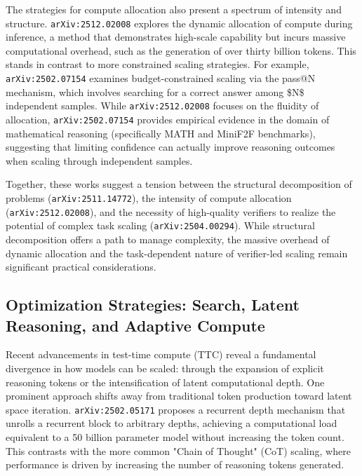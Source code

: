 \documentclass[11pt]{article}
\begin{document}
The strategies for compute allocation also present a spectrum of intensity and structure. \texttt{arXiv:2512.02008} explores the dynamic allocation of compute during inference, a method that demonstrates high-scale capability but incurs massive computational overhead, such as the generation of over thirty billion tokens. This stands in contrast to more constrained scaling strategies. For example, \texttt{arXiv:2502.07154} examines budget-constrained scaling via the pass@N mechanism, which involves searching for a correct answer among \$N\$ independent samples. While \texttt{arXiv:2512.02008} focuses on the fluidity of allocation, \texttt{arXiv:2502.07154} provides empirical evidence in the domain of mathematical reasoning (specifically MATH and MiniF2F benchmarks), suggesting that limiting confidence can actually improve reasoning outcomes when scaling through independent samples.

Together, these works suggest a tension between the structural decomposition of problems (\texttt{arXiv:2511.14772}), the intensity of compute allocation (\texttt{arXiv:2512.02008}), and the necessity of high-quality verifiers to realize the potential of complex task scaling (\texttt{arXiv:2504.00294}). While structural decomposition offers a path to manage complexity, the massive overhead of dynamic allocation and the task-dependent nature of verifier-led scaling remain significant practical considerations.

\subsection{Optimization Strategies: Search, Latent Reasoning, and Adaptive Compute}

Recent advancements in test-time compute (TTC) reveal a fundamental divergence in how models can be scaled: through the expansion of explicit reasoning tokens or the intensification of latent computational depth. One prominent approach shifts away from traditional token production toward latent space iteration. \texttt{arXiv:2502.05171} proposes a recurrent depth mechanism that unrolls a recurrent block to arbitrary depths, achieving a computational load equivalent to a 50 billion parameter model without increasing the token count. This contrasts with the more common "Chain of Thought" (CoT) scaling, where performance is driven by increasing the number of reasoning tokens generated.
\end{document}
